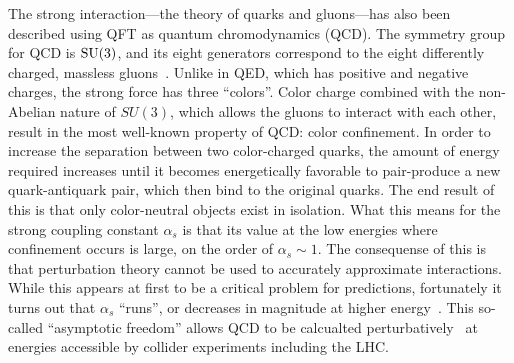 The strong interaction---the theory of quarks and gluons---has also been described using QFT as quantum chromodynamics (QCD).
The symmetry group for QCD is $\textrm{SU}(3)$, and its eight generators correspond to the eight differently charged, massless gluons~\cite{1965.Han-Nambu.Propose-color}.
Unlike in QED, which has positive and negative charges, the strong force has three ``colors''.
Color charge combined with the non-Abelian nature of $SU(3)$, which allows the gluons to interact with each other, result in the most well-known property of QCD: color confinement.
In order to increase the separation between two color-charged quarks, the amount of energy required increases until it becomes energetically favorable to pair-produce a new quark-antiquark pair, which then bind to the original quarks.
The end result of this is that only color-neutral objects exist in isolation. %
What this means for the strong coupling constant $\alpha_s$ is that its value at the low energies where confinement occurs is large, on the order of $\alpha_s\sim 1$.
The consequense of this is that perturbation theory cannot be used to accurately approximate interactions.
While this appears at first to be a critical problem for predictions, fortunately it turns out that $\alpha_s$ ``runs'', or decreases in magnitude at higher energy~\cite{1973.asymptotically-free-i, 1974.asymptotically-free-ii}.
This so-called ``asymptotic freedom'' allows QCD to be calcualted perturbatively~\cite{1973.strong-perturbation} at energies accessible by collider experiments including the LHC.

